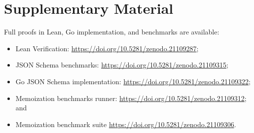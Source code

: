 \documentclass[acmsmall,%
  screen,%
  authorversion, %
  nonacm%
]{acmart}
\begin{document}
\section*{Supplementary Material}
\label{supplementary_material}
Full proofs in Lean, Go implementation, and benchmarks are available:
\begin{itemize}
\item Lean Verification: \url{https://doi.org/10.5281/zenodo.21109287};
\item JSON Schema benchmarks: \url{https://doi.org/10.5281/zenodo.21109315};
\item Go JSON Schema implementation: \url{https://doi.org/10.5281/zenodo.21109322};
\item Memoization benchmarks runner: \url{https://doi.org/10.5281/zenodo.21109312}; and
\item Memoization benchmark suite \url{https://doi.org/10.5281/zenodo.21109306}.
\end{itemize}



\end{document}
